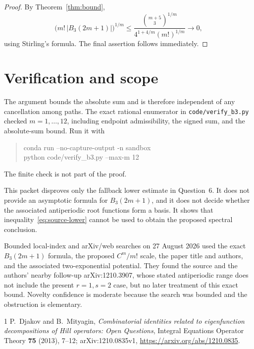 \documentclass[11pt]{article}
\begin{document}
\begin{proof}
By Theorem~\ref{thm:bound},
\[
 \bigl(m!\,|B_3(2m+1)|\bigr)^{1/m}
 \leq
 \frac{\binom{m+5}{3}^{1/m}}
 {4^{1+4/m}(m!)^{1/m}}\longrightarrow0,
\]
using Stirling's formula.  The final assertion follows immediately.
\end{proof}

\section{Verification and scope}

The argument bounds the absolute sum and is therefore independent of any
cancellation among paths.  The exact rational enumerator in
\texttt{code/verify\_b3.py} checked $m=1,\ldots,12$, including endpoint
admissibility, the signed sum, and the absolute-sum bound.  Run it with
\begin{quote}\small\ttfamily
conda run --no-capture-output -n sandbox\\
python code/verify\_b3.py --max-m 12
\end{quote}
The finite check is not part of the proof.

This packet disproves only the fallback lower estimate in Question~6.  It
does not provide an asymptotic formula for $B_3(2m+1)$, and it does not decide
whether the associated antiperiodic root functions form a basis.  It shows
that inequality~\eqref{eq:source-lower} cannot be used to obtain the proposed
spectral conclusion.

Bounded local-index and arXiv/web searches on 27 August 2026 used the exact
$B_3(2m+1)$ formula, the proposed $C^m/m!$ scale, the paper title and authors,
and the associated two-exponential potential.  They found the source and the
authors' nearby follow-up arXiv:1210.3907, whose stated antiperiodic range does
not include the present $r=1,s=2$ case, but no later treatment of this exact
bound.  Novelty confidence is moderate because the search was bounded and the
obstruction is elementary.

\begin{thebibliography}{1}
P.~Djakov and B.~Mityagin,
\emph{Combinatorial identities related to eigenfunction decompositions of
Hill operators: Open Questions}, Integral Equations Operator Theory
\textbf{75} (2013), 7--12; arXiv:1210.0835v1,
\url{https://arxiv.org/abs/1210.0835}.
\end{thebibliography}
\end{document}

